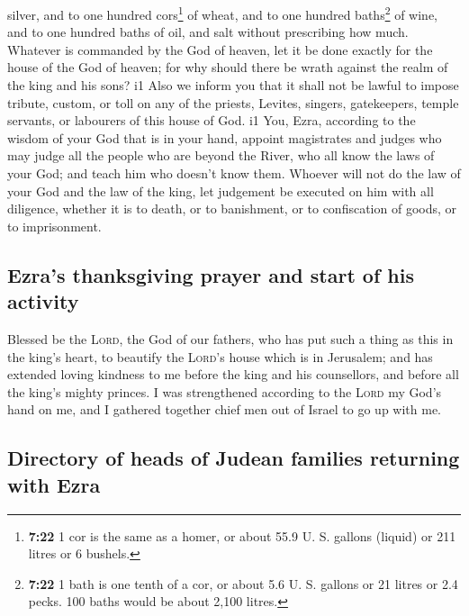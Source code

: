silver, and to one hundred cors\footnote{\textbf{7:22} 1 cor is the same
  as a homer, or about 55.9 U. S. gallons (liquid) or 211 litres or 6
  bushels.} of wheat, and to one hundred baths\footnote{\textbf{7:22} 1
  bath is one tenth of a cor, or about 5.6 U. S. gallons or 21 litres or
  2.4 pecks. 100 baths would be about 2,100 litres.} of wine, and to one
hundred baths of oil, and salt without prescribing how much.
 Whatever is commanded by the God of heaven, let it be
done exactly for the house of the God of heaven; for why should there be
wrath against the realm of the king and his sons? i1 
Also we inform you that it shall not be lawful to impose tribute,
custom, or toll on any of the priests, Levites, singers, gatekeepers,
temple servants, or labourers of this house of God. i1 
You, Ezra, according to the wisdom of your God that is in your hand,
appoint magistrates and judges who may judge all the people who are
beyond the River, who all know the laws of your God; and teach him who
doesn't know them.  Whoever will not do the law of your
God and the law of the king, let judgement be executed on him with all
diligence, whether it is to death, or to banishment, or to confiscation
of goods, or to imprisonment.

\hypertarget{ezras-thanksgiving-prayer-and-start-of-his-activity}{%
\subsection{Ezra's thanksgiving prayer and start of his
activity}\label{ezras-thanksgiving-prayer-and-start-of-his-activity}}

 Blessed be the \textsc{Lord}, the God of our fathers,
who has put such a thing as this in the king's heart, to beautify the
\textsc{Lord}'s house which is in Jerusalem;  and has
extended loving kindness to me before the king and his counsellors, and
before all the king's mighty princes. I was strengthened according to
the \textsc{Lord} my God's hand on me, and I gathered together chief men
out of Israel to go up with me.

\hypertarget{directory-of-heads-of-judean-families-returning-with-ezra}{%
\subsection{Directory of heads of Judean families returning with
Ezra}\label{directory-of-heads-of-judean-families-returning-with-ezra}}

